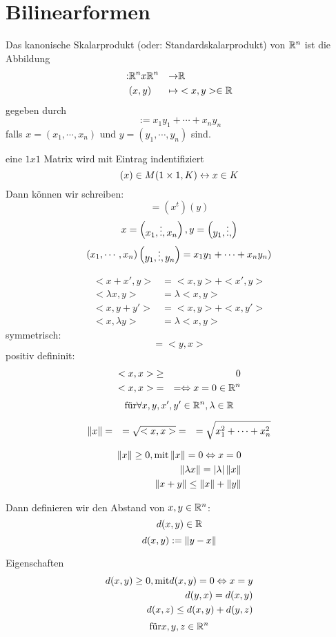 \section{Bilinearformen}
Das kanonische Skalarprodukt (oder: Standardskalarprodukt) von $\mathbb{R}^n$ ist die Abbildung
\begin{align*}<,>: & \mb{R}^nx\mb{R}^n & \to & \mb{R}\\
 & (x,y) & \mapsto & <x,y>\in\mb{R}
\end{align*}
gegeben durch
\[<x,y>:=x_1y_1+\cdots+x_ny_n\]
falls $x=(x_1,\cdots,x_n)$ und $y=(y_1,\cdots,y_n)$ sind.
\begin{Def}[Konvention]
eine $1x1$ Matrix wird mit Eintrag indentifiziert
\[(x)\in{}M(1\times 1,K) \leftrightarrow x\in{}K\]
Dann können wir schreiben:
\[<x,y>=(x^t)(y)\]
\[x=\begin{pmatrix}x_1,\vdots,x_n\end{pmatrix}, y=\begin{pmatrix}y_1,\vdots,\end{pmatrix}\]
\[(x_1,\cdots,x_n)\begin{pmatrix}y_1,\vdots,y_n\end{pmatrix}=x_1y_1+\cdots+x_ny_n)\]
\end{Def}
\begin{Bem}
\begin{align*}
  <x+x',y>&=<x,y>+<x',y>\\
  <\lambda{}x,y>&=\lambda<x,y>\\
  <x,y+y'>&=<x,y>+<x,y'>\\
  <x,\lambda{}y>&=\lambda<x,y>
\end{align*}
symmetrisch:
\[<x,y>=<y,x>\]
positiv defininit:
\begin{align*}
  <x,x> &\geq& 0 \\
  <x,x> &=&= \Leftrightarrow x=0\in\mathbb{R}^n
\end{align*}
\[\text{für} \forall x,y,x',y'\in\mathbb{R}^n, \lambda\in\mathbb{R}\]
\end{Bem}
\begin{Bem}
\begin{align*}
  \left\| x \right\|&=&=\sqrt{<x,x>}
  &=&=\sqrt{x^2_1+\cdots+x_n^2}
\end{align*}
\end{Bem}
\begin{Bem}
\begin{align*}
  \left\| x \right\|\geq0, \text{mit} \left\| x \right\|=0 \Leftrightarrow x=0\\
  \left\| \lambda{}x \right\|=\left| \lambda \right|\left\| x \right\|\\
  \left\| x+y \right\|\leq\left\| x \right\|+\left\| y \right\|
\end{align*}
\end{Bem}
Dann definieren wir den Abstand von $x,y\in\mathbb{R}^n$:
\[d(x,y)\in\mathbb{R}\]
\[d(x,y):=\left\| y-x \right\|\]
\begin{Bem}{Eigenschaften}
\begin{align*}
  d(x,y)\geq0, \text{mit}d(x,y)=0 \Leftrightarrow x=y\\
  d(y,x)=d(x,y)\\
  d(x,z)\leq d(x,y)+d(y,z)
\end{align*}
\[\text{für} x,y,z\in\mathbb{R}^n\]
\end{Bem}
